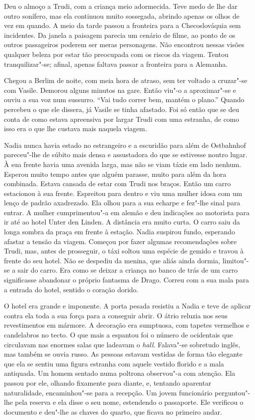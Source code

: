 Deu o almoço a Trudi, com a criança meio adormecida. Teve medo de lhe
dar outro sonífero, mas ela continuou muito sossegada, abrindo apenas os
olhos de vez em quando. A meio da tarde passou a fronteira para a Checoslováquia sem incidentes. Da janela a paisagem parecia um cenário de
filme, ao ponto de os outros passageiros poderem ser meras personagens.
Não encontrou nessas visões qualquer beleza por estar tão preocupada com
os riscos da viagem. Tentou tranquilizar"-se; afinal, apenas faltava
passar a fronteira para a Alemanha.

\bigskip

Chegou a Berlim de noite, com meia hora de atraso, sem ter voltado a
cruzar"-se com Vasile. Demorou alguns minutos na gare. Então viu"-o a
aproximar"-se e ouviu a sua voz num sussurro. ``Vai tudo correr bem,
mantém o plano.'' Quando percebeu o que ele dissera, já Vasile se tinha
afastado. Foi só então que se deu conta de como estava apreensiva
por largar Trudi com uma estranha, de como isso era o que lhe custava
mais naquela viagem.

Nadia nunca havia estado no estrangeiro e a escuridão para além de
Ostbahnhof pareceu"-lhe de súbito mais densa e assustadora do que se
estivesse noutro lugar. À sua frente havia uma avenida larga, mas não se
viam táxis em lado nenhum. Esperou muito tempo antes que alguém parasse,
muito para além da hora combinada. Estava cansada de estar com Trudi nos
braços. Então um carro estacionou à sua frente. Espreitou para dentro e
viu uma mulher idosa com um lenço de padrão axadrezado. Ela olhou para a
sua echarpe e fez"-lhe sinal para entrar. A mulher cumprimentou"-a em
alemão e deu indicações ao motorista para ir até ao hotel Unter den
Linden. A distância era muito curta. O carro saiu da longa sombra da
praça em frente à estação. Nadia suspirou fundo, esperando afastar a
tensão da viagem. Começou por fazer algumas recomendações sobre Trudi,
mas, antes de prosseguir, o táxi soltou uma espécie de gemido e travou à
frente do seu hotel. Não se despediu da menina, que aliás ainda dormia,
limitou"-se a sair do carro. Era como se deixar a criança no banco de
trás de um carro significasse abandonar o próprio fantasma de Drago.
Correu com a sua mala para a entrada do hotel, sentido o coração dorido.

O hotel era grande e imponente. A porta pesada resistiu
a Nadia e teve de aplicar contra ela toda a sua força para a conseguir
abrir. O átrio reluzia nos seus revestimentos em mármore. A decoração
era sumptuosa, com tapetes vermelhos e candelabros no tecto. O que mais
a espantou foi o número de ocidentais que circulavam nas enormes salas
que ladeavam o \emph{hall}. Falava"-se sobretudo inglês, mas também se
ouvia russo. As pessoas estavam vestidas de
forma tão elegante que ela se sentiu uma figura estranha com aquele
vestido florido e a mala antiquada. Um homem sentado numa poltrona
observou"-a com atenção. Ela passou por ele, olhando fixamente para
diante, e, tentando aparentar naturalidade, encaminhou"-se para a
recepção. Um jovem funcionário perguntou"-lhe pela reserva e ela disse o
seu nome, estendendo o passaporte. Ele verificou o documento e deu"-lhe
as chaves do quarto, que ficava no primeiro andar.

